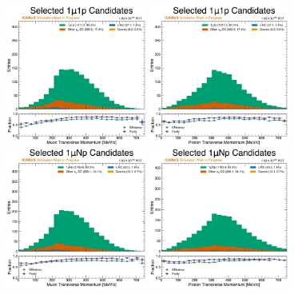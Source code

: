 \begin{figure}[!htb]
    \centering
    \includegraphics[width=0.41\textwidth]{figures/neutrino_selection/selected_hist1d_1mu1p_muon_pt.pdf}
    \includegraphics[width=0.41\textwidth]{figures/neutrino_selection/selected_hist1d_1mu1p_proton_pt.pdf}
    \\
    \includegraphics[width=0.41\textwidth]{figures/neutrino_selection/selected_hist1d_1muNp_muon_pt.pdf}
    \includegraphics[width=0.41\textwidth]{figures/neutrino_selection/selected_hist1d_1muNp_proton_pt.pdf}

\end{figure}

